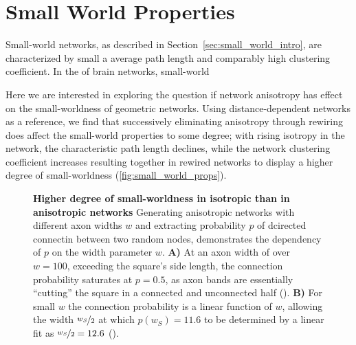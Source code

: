 

\newpage
\section{Small World Properties}\label{sec:small_world}

Small-world networks, as described in
Section~\ref{sec:small_world_intro}, are characterized by small a
average path length and comparably high clustering coefficient. In the
of brain networks, small-world

\parencite{Watts1998}

Here we are interested in exploring the question if network anisotropy
has effect on the small-worldness of geometric networks. Using
distance-dependent networks as a reference, we find that successively eliminating
anisotropy through rewiring does affect the small-world properties to
some degree; with rising isotropy in the network, the characteristic
path length declines, while the network clustering coefficient
increases resulting together in rewired networks to display a higher
degree of small-worldness (\autoref{fig:small_world_props}).

\begin{figure}[htp]
  \centering
  \caption{\textbf{Higher degree of small-worldness in
      isotropic than in anisotropic networks} Generating
    anisotropic networks with different axon widths $w$ and extracting
    probability $p$ of dcirected connectin between two random nodes,
    demonstrates the dependency of $p$ on the width parameter $w$.
    \textbf{A)} At an axon width of over $w=100$, exceeding the
    square's side length, the connection probability saturates at
    $p=0.5$, as axon bands are essentially \enquote{cutting} the
    square in a connected and unconnected half
    (). \textbf{B)} For small $w$ the connection
    probability is a linear function of $w$, allowing the width $\nicefrac{w_S}{2}$
    at which $p(w_S)=11.6$ to be determined by a linear fit as
    $\nicefrac{w_S}{2} =
    12.6$ ().} %
  \label{fig:small_world_props}
\end{figure}  



